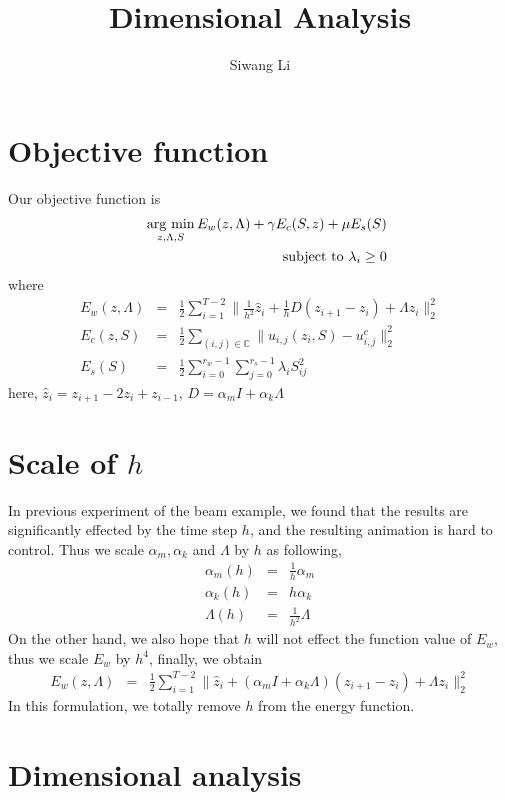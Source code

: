 \documentclass[9pt,twocolumn]{extarticle}
\author{Siwang Li}
\title{Dimensional Analysis}
\newcommand{\argmin}{\operatornamewithlimits{arg\ min}}
\begin{document}
\maketitle

\setlength{\parskip}{0.5ex}

\section{Objective function}
Our objective function is
\begin{eqnarray}\label{mtl-opt}
  &&\argmin_{z,\Lambda,S} E_w(z,\Lambda)+\gamma E_c(S,z)+\mu E_s(S)\\
  &&\mbox {subject to } \lambda_i \ge 0
\end{eqnarray}
where
\begin{eqnarray}\label{energies}
  E_w(z,\Lambda) &=& \frac{1}{2}\sum_{i=1}^{T-2}
  \|\frac{1}{h^2}\hat{z}_{i}+\frac{1}{h}D(z_{i+1}-z_{i})+
  \Lambda z_i\|_2^2\\
  E_c(z,S) &=& \frac{1}{2}\sum_{(i,j)\in \mathbb{C}}\|u_{i,j}(z_i,S)-u^c_{i,j}\|_2^2\\
  E_s(S) &=& \frac{1}{2}\sum_{i=0}^{r_w-1}\sum_{j=0}^{r_s-1}\lambda_i S^2_{i j}
\end{eqnarray}
here, $\hat{z}_i = z_{i+1}-2z_{i}+z_{i-1}$, $D=\alpha_mI+\alpha_k\Lambda$

\section{Scale of $h$}
In previous experiment of the beam example, we found that the results are
significantly effected by the time step $h$, and the resulting animation is
hard to control. Thus we scale $\alpha_m,\alpha_k$ and $\Lambda$ by $h$ as
following,
\begin{eqnarray}
 \alpha_m(h) &=& \frac{1}{h}\alpha_m  \\
 \alpha_k(h) &=& h\alpha_k  \\
 \Lambda(h) &=& \frac{1}{h^2}\Lambda
\end{eqnarray}
On the other hand, we also hope that $h$ will not effect the function value of
$E_w$, thus we scale $E_w$ by $h^4$, finally, we obtain
\begin{eqnarray}
  E_w(z,\Lambda) &=&\frac{1}{2}\sum_{i=1}^{T-2}\|\hat{z}_{i}+(\alpha_mI+\alpha_k\Lambda)(z_{i+1}-z_{i})+\Lambda z_i\|_2^2
\end{eqnarray}
In this formulation, we totally remove $h$ from the energy function. 

\section{Dimensional analysis}
\end{document}
